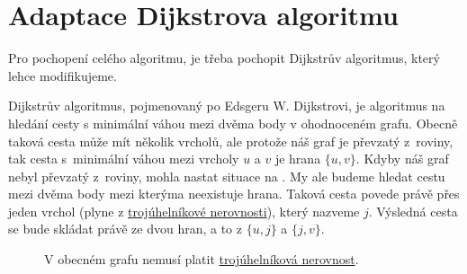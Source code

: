 \section{Adaptace Dijkstrova algoritmu}
\label{sec:dijkstra}

Pro pochopení celého algoritmu, je třeba pochopit Dijkstrův algoritmus, který lehce modifikujeme. 

Dijkstrův algoritmus, pojmenovaný po Edsgeru W. Dijkstrovi, je algoritmus na hledání cesty s minimální váhou mezi dvěma body v ohodnoceném grafu. Obecně taková cesta může mít několik vrcholů, ale protože náš graf je převzatý z~roviny, tak cesta s~minimální váhou mezi vrcholy $u$ a $v$ je hrana $\{u, v\}$. Kdyby náš graf nebyl převzatý z~roviny, mohla nastat situace na . My ale budeme hledat cestu mezi dvěma body mezi kterýma %
neexistuje hrana. Taková cesta povede právě přes jeden vrchol (plyne z \hyperref[definice:trojuhelnikova_nerovnost]{trojúhelníkové nerovnosti}), který nazveme $j$. Výsledná cesta se bude skládat právě ze dvou hran, a to z $\{u, j\}$ a $\{j, v\}$.

\begin{figure}[H]

    \centering
    \caption{V obecném grafu nemusí platit \hyperref[definice:trojuhelnikova_nerovnost]{trojúhelníková nerovnost}.}
    \label{obr:troj_ner_graf}
\end{figure}

